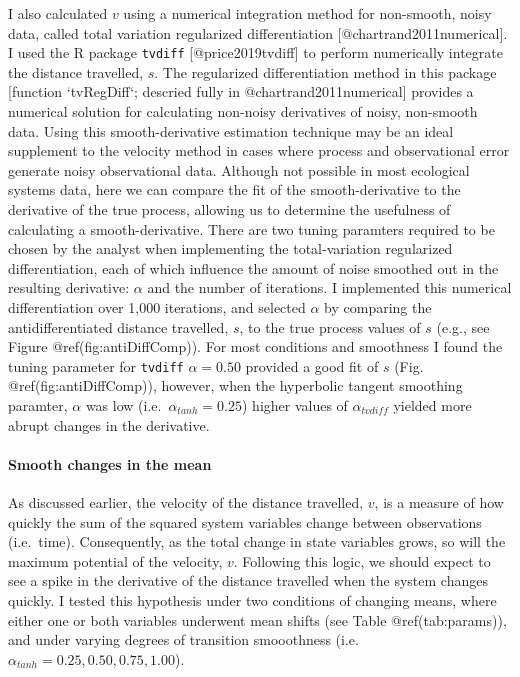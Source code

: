 \documentclass[]{article}
\let\oldparagraph\paragraph
\renewcommand{\paragraph}[1]{\oldparagraph{#1}\mbox{}}
\begin{document}
I also calculated \(v\) using a numerical integration method for
non-smooth, noisy data, called total variation regularized
differentiation {[}@chartrand2011numerical{]}. I used the R package
\texttt{tvdiff} {[}@price2019tvdiff{]} to perform numerically integrate
the distance travelled, \(s\). The regularized differentiation method in
this package {[}function `tvRegDiff`; descried fully in
@chartrand2011numerical{]} provides a numerical solution for calculating
non-noisy derivatives of noisy, non-smooth data. Using this
smooth-derivative estimation technique may be an ideal supplement to the
velocity method in cases where process and observational error generate
noisy observational data. Although not possible in most ecological
systems data, here we can compare the fit of the smooth-derivative to
the derivative of the true process, allowing us to determine the
usefulness of calculating a smooth-derivative. There are two tuning
paramters required to be chosen by the analyst when implementing the
total-variation regularized differentiation, each of which influence the
amount of noise smoothed out in the resulting derivative: \(\alpha\) and
the number of iterations. I implemented this numerical differentiation
over 1,000 iterations, and selected \(\alpha\) by comparing the
antidifferentiated distance travelled, \(s\), to the true process values
of \(s\) (e.g., see Figure @ref(fig:antiDiffComp)). For most conditions
and smoothness I found the tuning parameter for \texttt{tvdiff}
\(\alpha=0.50\) provided a good fit of \(s\) (Fig.
@ref(fig:antiDiffComp)), however, when the hyperbolic tangent smoothing
paramter, \(\alpha\) was low (i.e.~\(\alpha_{tanh}=0.25\)) higher values
of \(\alpha_{tvdiff}\) yielded more abrupt changes in the derivative.

\hypertarget{smooth-changes-in-the-mean}{%
\paragraph{Smooth changes in the
mean}\label{smooth-changes-in-the-mean}}

As discussed earlier, the velocity of the distance travelled, \(v\), is
a measure of how quickly the sum of the squared system variables change
between observations (i.e.~time). Consequently, as the total change in
state variables grows, so will the maximum potential of the velocity,
\(v\). Following this logic, we should expect to see a spike in the
derivative of the distance travelled when the system changes quickly. I
tested this hypothesis under two conditions of changing means, where
either one or both variables underwent mean shifts (see Table
@ref(tab:params)), and under varying degrees of transition smooothness
(i.e.~\(\alpha_{tanh}={0.25, 0.50, 0.75, 1.00}\)).
\end{document}
